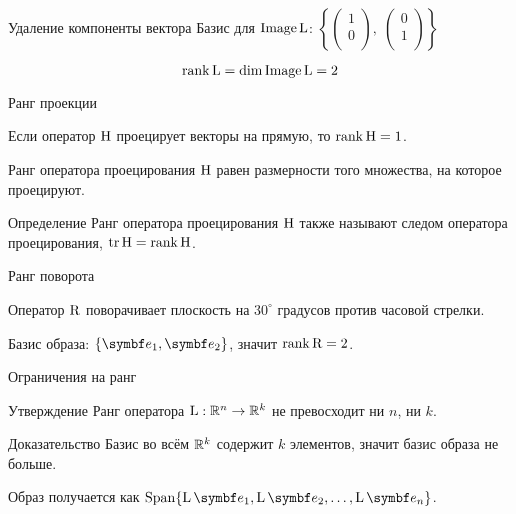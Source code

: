 \begin{frame}{Удаление компоненты вектора}
\pause 
Базис для $\operatorname{Image} \operatorname{L}$: $\left\{\begin{pmatrix}
1 \\
0 \\
\end{pmatrix}, \;
\begin{pmatrix}
0 \\
1 \\
\end{pmatrix} \right\}$

\[
\rank \operatorname{L} = \dim \operatorname{Image} \operatorname{L} = 2    
\]

\end{frame}

\begin{frame}{Ранг проекции}

Если оператор $\mathrm{H}$ проецирует векторы на прямую, то $\rank \mathrm{H} = 1$.

\pause

Ранг оператора проецирования $\mathrm{H}$ равен размерности того множества, на которое проецируют.

\pause

\begin{block}{Определение}
Ранг оператора проецирования $\mathrm{H}$ также называют \alert{следом оператора проецирования},
$\trace \HH = \rank \HH$.
\end{block}


\end{frame}


\begin{frame}{Ранг поворота}

Оператор $\mathrm{R}$ поворачивает плоскость на $30^{\circ}$ градусов против часовой стрелки.

\pause

Базис образа: $\{ \be_1, \be_2 \}$, значит $\rank \mathrm{R}  = 2$.



\end{frame}
    


\begin{frame}{Ограничения на ранг}

\begin{block}{Утверждение}
Ранг оператора $\operatorname{L}: \mathbb{R}^n \to \mathbb{R}^k$ не превосходит ни $n$, ни $k$. 
\end{block}

\pause

\begin{block}{Доказательство}
Базис во всём $\mathbb{R}^k$ содержит $k$ элементов, значит базис образа не больше.
\pause

Образ получается как $\Span\{\LL \be_1, \LL\be_2, \ldots, \LL \be_n \}$.
\end{block}
\end{frame}

